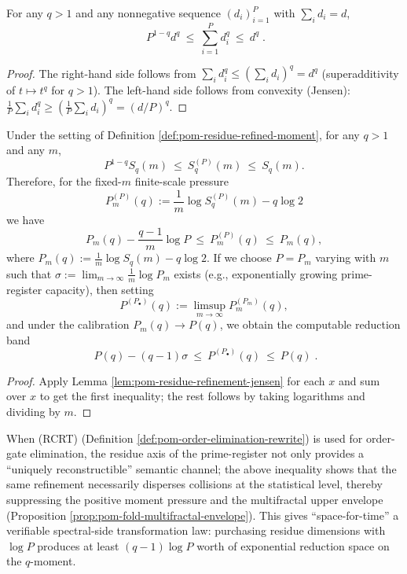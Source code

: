 \begin{lemma}\label{lem:pom-residue-refinement-jensen}
For any \(q>1\) and any nonnegative sequence \((d_i)_{i=1}^P\) with \(\sum_i d_i=d\),
$$
\boxed{\;
P^{1-q}d^q\ \le\ \sum_{i=1}^{P}d_i^q\ \le\ d^q\; }.
$$
\end{lemma}
\begin{proof}
The right-hand side follows from \(\sum_i d_i^q\le (\sum_i d_i)^q=d^q\) (superadditivity of \(t\mapsto t^q\) for \(q>1\)).
The left-hand side follows from convexity (Jensen): \(\frac{1}{P}\sum_i d_i^q\ge (\frac{1}{P}\sum_i d_i)^q=(d/P)^q\).
\end{proof}

\begin{corollary}\label{cor:pom-rcrt-pressure-reduction-law}
Under the setting of Definition \ref{def:pom-residue-refined-moment}, for any \(q>1\) and any \(m\),
$$
P^{1-q}S_q(m)\ \le\ S_q^{(P)}(m)\ \le\ S_q(m).
$$
Therefore, for the fixed-\(m\) finite-scale pressure
$$
P_m^{(P)}(q):=\frac{1}{m}\log S_q^{(P)}(m)-q\log 2
$$
we have
$$
P_m(q)-\frac{q-1}{m}\log P\ \le\ P_m^{(P)}(q)\ \le\ P_m(q),
$$
where \(P_m(q):=\frac{1}{m}\log S_q(m)-q\log 2\).
If we choose \(P=P_m\) varying with \(m\) such that
\(
\sigma:=\lim_{m\to\infty}\frac{1}{m}\log P_m
\)
exists (e.g., exponentially growing prime-register capacity), then setting
\[
P^{(P_\bullet)}(q):=\limsup_{m\to\infty} P_m^{(P_m)}(q),
\]
and under the calibration \(P_m(q)\to P(q)\), we obtain the computable reduction band
$$
\boxed{\;
P(q)- (q-1)\sigma\ \le\ P^{(P_\bullet)}(q)\ \le\ P(q)\; }.
$$
\end{corollary}
\begin{proof}
Apply Lemma \ref{lem:pom-residue-refinement-jensen} for each \(x\) and sum over \(x\) to get the first inequality; the rest follows by taking logarithms and dividing by \(m\).
\end{proof}

\begin{remark}\label{rem:pom-rcrt-pressure-meaning}
When (RCRT) (Definition \ref{def:pom-order-elimination-rewrite}) is used for order-gate elimination, the residue axis of the prime-register not only provides a ``uniquely reconstructible'' semantic channel; the above inequality shows that the same refinement necessarily disperses collisions at the statistical level, thereby suppressing the positive moment pressure and the multifractal upper envelope (Proposition \ref{prop:pom-fold-multifractal-envelope}).
This gives ``space-for-time'' a verifiable spectral-side transformation law: purchasing residue dimensions with \(\log P\) produces at least \((q-1)\log P\) worth of exponential reduction space on the \(q\)-moment.
\end{remark}

